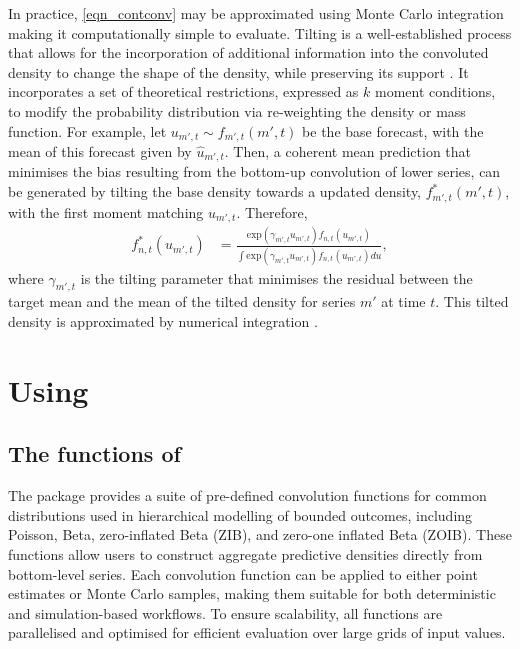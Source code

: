 In practice, \eqref{eqn_contconv} may be approximated using Monte Carlo integration making it computationally simple to evaluate. \newline
Tilting is a well-established process that allows for the incorporation of additional information into the convoluted density to change the shape of the density, while preserving its support \citep{GiacominiRagusa2014, KruegerClarkRavazzolo2017, West2024}. It incorporates a set of theoretical restrictions, expressed as \(k\) moment conditions, to modify the probability distribution via re-weighting the density or mass function. For example, let \(u_{m',t} \sim f_{m', t}(m', t)\) be the base forecast, with the mean of this forecast given by \(\hat{u}_{m',t}\). Then, a coherent mean prediction that minimises the bias resulting from the bottom-up convolution of lower series, can be generated by tilting the base density towards a updated density, \(f^{*}_{m', t}(m', t)\), with the first moment matching \(\hat{u}_{m',t}\). Therefore,
\begin{align}
    f_{n, t}^{*}(u_{m', t}) &= \frac{ \text{exp}(\gamma_{m',t} u_{m',t}) f_{n,t}(u_{m',t})}
    {\int \text{exp}(\gamma_{m',t} u_{m',t}) f_{n,t}(u_{m',t}) du}, 
\end{align}
where \(\gamma_{m',t}\) is the tilting parameter that minimises the residual between the target mean and the mean of the tilted density for series \(m'\) at time \(t\). This tilted density is approximated by numerical integration \citep{BurdenFaires2015}.

\section{\texorpdfstring{Using }{Using }}\label{using}

\subsection{\texorpdfstring{The functions of }{The functions of }}\label{the-functions-of}

The  package provides a suite of pre-defined convolution functions for common distributions used in hierarchical modelling of bounded outcomes, including Poisson, Beta, zero-inflated Beta (ZIB), and zero-one inflated Beta (ZOIB). These functions allow users to construct aggregate predictive densities directly from bottom-level series. Each convolution function can be applied to either point estimates or Monte Carlo samples, making them suitable for both deterministic and simulation-based workflows. To ensure scalability, all functions are parallelised and optimised for efficient evaluation over large grids of input values.

